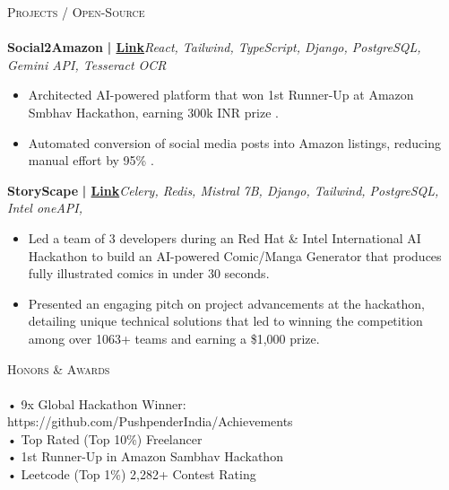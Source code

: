 \documentclass[a4paper]{article}
\newcommand{\lineunder} {
    \vspace*{-8pt} \\
    \hspace*{-18pt} \hrulefill \\
}
\newcommand{\header} [1] {
    {\hspace*{-18pt}\vspace*{6pt} \textsc{#1}}
    \vspace*{-6pt} \lineunder
}
\begin{document}
      \header{Projects / Open-Source}
      \vspace{2mm}
      {\textbf{Social2Amazon}}\textbf{ | \href{https://amazonsmbhav2024.hackerearth.com/}{Link}}\hfill{\sl React, Tailwind, TypeScript, Django, PostgreSQL, Gemini API, Tesseract OCR}\\
          \vspace{-3mm}
\begin{itemize} \itemsep -3pt
\item[]  Architected AI-powered platform that won 1st Runner-Up at Amazon Smbhav Hackathon, earning 300k INR prize .
\item[]  Automated conversion of social media posts into Amazon listings, reducing manual effort by 95\% .
\end{itemize}
          \vspace*{3mm}
      {\textbf{StoryScape}}\textbf{ | \href{https://devpost.com/software/storyscape-znf1xm}{Link}}\hfill{\sl Celery, Redis, Mistral 7B, Django, Tailwind, PostgreSQL, Intel oneAPI,}\\
          \vspace{-3mm}
\begin{itemize} \itemsep -3pt
\item[]  Led a team of 3 developers during an Red Hat \& Intel International AI Hackathon to build an AI-powered Comic/Manga Generator that produces fully illustrated comics in under 30 seconds.
\item[]  Presented an engaging pitch on project advancements at the hackathon, detailing unique technical solutions that led to winning the competition among over 1063+ teams and earning a \$1,000 prize.
\end{itemize}
          \vspace*{3mm}



\header{Honors \& Awards}
      \vspace{2mm}
      • 9x Global Hackathon Winner: https://github.com/PushpenderIndia/Achievements\\
\vspace*{1mm}
      • Top Rated (Top 10\%) Freelancer\\
\vspace*{1mm}
      • 1st Runner-Up in Amazon Sambhav Hackathon\\
\vspace*{1mm}
      • Leetcode (Top 1\%) 2,282+ Contest Rating\\
\vspace*{1mm}

    \ 
    
\end{document}
